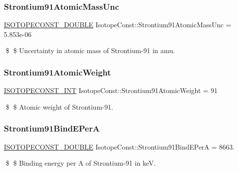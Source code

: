 \subsubsection{\texorpdfstring{Strontium91\+Atomic\+Mass\+Unc}{Strontium91AtomicMassUnc}}
{\footnotesize\ttfamily \mbox{\hyperlink{group___isotope_const-_macros_ga8f45a7272ce02c0b4c65c44636ed719a}{I\+S\+O\+T\+O\+P\+E\+C\+O\+N\+S\+T\+\_\+\+D\+O\+U\+B\+LE}} Isotope\+Const\+::\+Strontium91\+Atomic\+Mass\+Unc = 5.\+853e-\/06}

\$ \$ Uncertainty in atomic mass of Strontium-\/91 in amu. \mbox{\label{group___isotope_const-_strontium-_sr91_gab5fb0c108e20bdbd8780a68ee96915ca}} 
\subsubsection{\texorpdfstring{Strontium91\+Atomic\+Weight}{Strontium91AtomicWeight}}
{\footnotesize\ttfamily \mbox{\hyperlink{group___isotope_const-_macros_ga5f18360b3e99483a35c32d789e62621c}{I\+S\+O\+T\+O\+P\+E\+C\+O\+N\+S\+T\+\_\+\+I\+NT}} Isotope\+Const\+::\+Strontium91\+Atomic\+Weight = 91}

\$ \$ Atomic weight of Strontium-\/91. \mbox{\label{group___isotope_const-_strontium-_sr91_ga08364352afda3a32c1fdad71a2d9a85e}} 
\subsubsection{\texorpdfstring{Strontium91\+Bind\+E\+PerA}{Strontium91BindEPerA}}
{\footnotesize\ttfamily \mbox{\hyperlink{group___isotope_const-_macros_ga8f45a7272ce02c0b4c65c44636ed719a}{I\+S\+O\+T\+O\+P\+E\+C\+O\+N\+S\+T\+\_\+\+D\+O\+U\+B\+LE}} Isotope\+Const\+::\+Strontium91\+Bind\+E\+PerA = 8663.}

\$ \$ Binding energy per A of Strontium-\/91 in keV. \mbox{\label{group___isotope_const-_strontium-_sr91_ga4c575fc9e2a01f5e1e53070f9f37f2e2}} 
